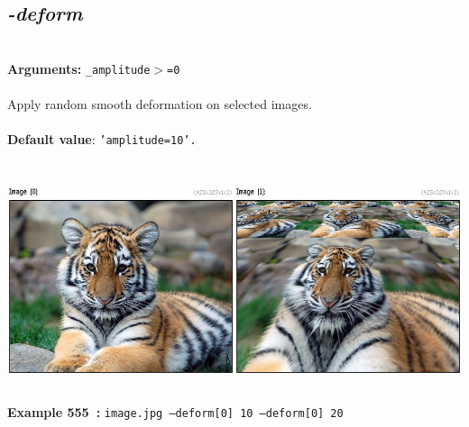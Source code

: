 \documentclass[a4paper,11pt,twoside]{book}
\begin{document}
\subsection{\emph{-deform} }\vspace*{-0.5em}
~\\\textbf{Arguments: } 
{\small \texttt{\_amplitude$>$=0}}\\~\\
Apply random smooth deformation on selected images.
~\\~\\\textbf{Default value}: {\small \texttt{'amplitude=10'.}}
\begin{center}\includegraphics[keepaspectratio=true,height=7cm,width=\textwidth]{img/gmic_def555.jpg}\\
{\footnotesize \textbf{Example 555~:} \texttt{image.jpg --deform[0] 10 --deform[0] 20}}
\end{center}
\end{document}
